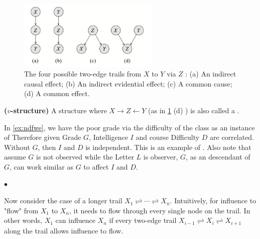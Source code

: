 \documentclass{article}
\newcommand{\bfs}[1]{\textbf{({#1}) }}
\begin{document}
\begin{figure}
    \centering
    \includegraphics[width=0.6\textwidth]{Figs/a6.png}
    \caption{The four possible two-edge trails from $X$ to $Y$ via $Z$ : (a) An indirect causal effect; (b) An indirect evidential effect; (c) A common cause; (d) A common effect.}
    \label{fig:3node}
\end{figure}
\begin{defa}\bfs{$v$-structure}
A structure where $X \rightarrow Z \leftarrow Y$ (as in \cref{fig:3node} (d) ) is also called a .
\end{defa}
\begin{exma}
    In \cref{ex:ndfwe}, we have  the poor grade via the difficulty of the class as an instance of  Therefore given Grade $G$, Intelligence $I$ and course Difficulty $D$  are correlated.
Without  $G$,  then $I$ and  $D$ is independent. This is an example of . Also note that assume $G$ is not observed while the Letter $L$ is observer, $G$, as an descendant of $G$, can work similar as $G$ to affect $I$ and $D$.
\end{exma}


$\bullet$ 



 Now consider the case of a longer trail $X_{1} \rightleftharpoons \cdots \rightleftharpoons X_{n}$. Intuitively, for influence to "flow" from $X_{1}$ to $X_{n}$, it needs to flow through every single node on the trail. In other words, $X_{1}$ can influence $X_{n}$ if every two-edge trail $X_{i-1} \rightleftharpoons X_{i} \rightleftharpoons X_{i+1}$ along the trail allows influence to flow.
 
\end{document}
